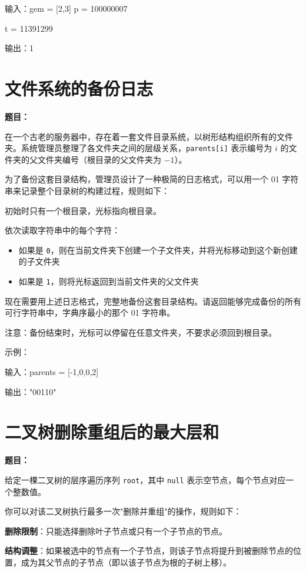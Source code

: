 \documentclass[12pt, a4paper]{article}
\begin{document}
输入：gem = [2,3] p = 100000007 

t = 11391299

输出：1



\section{文件系统的备份日志}

\noindent\textbf{题目：}

在一个古老的服务器中，存在着一套文件目录系统，以树形结构组织所有的文件夹。系统管理员整理了各文件夹之间的层级关系，\texttt{parents[i]} 表示编号为 $i$ 的文件夹的父文件夹编号（根目录的父文件夹为 $-1$）。

为了备份这套目录结构，管理员设计了一种极简的日志格式，可以用一个 01 字符串来记录整个目录树的构建过程，规则如下：

初始时只有一个根目录，光标指向根目录。

依次读取字符串中的每个字符：
\begin{itemize}[leftmargin=2em]
  \item 如果是 \texttt{0}，则在当前文件夹下创建一个子文件夹，并将光标移动到这个新创建的子文件夹
  \item 如果是 \texttt{1}，则将光标返回到当前文件夹的父文件夹
\end{itemize}

现在需要用上述日志格式，完整地备份这套目录结构。请返回能够完成备份的所有可行字符串中，字典序最小的那个 01 字符串。

注意：备份结束时，光标可以停留在任意文件夹，不要求必须回到根目录。

示例：

输入：parents = [-1,0,0,2]

输出："00110"



\section{二叉树删除重组后的最大层和}

\noindent\textbf{题目：}

给定一棵二叉树的层序遍历序列 \texttt{root}，其中 \texttt{null} 表示空节点，每个节点对应一个整数值。

你可以对该二叉树执行最多一次"删除并重组"的操作，规则如下：

\textbf{删除限制}：只能选择删除叶子节点或只有一个子节点的节点。

\textbf{结构调整}：如果被选中的节点有一个子节点，则该子节点将提升到被删除节点的位置，成为其父节点的子节点（即以该子节点为根的子树上移）。
\end{document}
